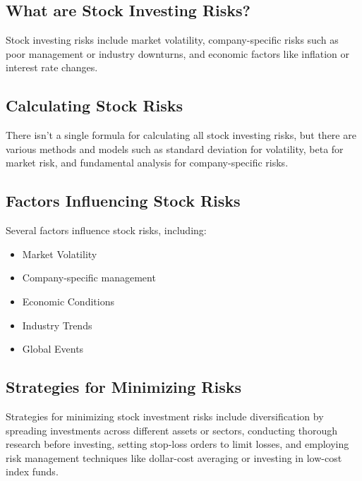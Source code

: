 \subsection{What are Stock Investing Risks?}
Stock investing risks include market volatility, company-specific risks such as poor management or industry downturns, and economic factors like inflation or interest rate changes.

\subsection{Calculating Stock Risks}
There isn't a single formula for calculating all stock investing risks, but there are various methods and models such as standard deviation for volatility, beta for market risk, and fundamental analysis for company-specific risks.

\subsection{Factors Influencing Stock Risks}
Several factors influence stock risks, including:
\begin{itemize}
    \item Market Volatility
    \item Company-specific management
    \item Economic Conditions
    \item Industry Trends
    \item Global Events
\end{itemize}

\subsection{Strategies for Minimizing Risks}
Strategies for minimizing stock investment risks include diversification by spreading investments across different assets or sectors, conducting thorough research before investing, setting stop-loss orders to limit losses, and employing risk management techniques like dollar-cost averaging or investing in low-cost index funds.



